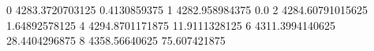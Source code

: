 0 4283.3720703125 0.4130859375
1 4282.958984375 0.0
2 4284.60791015625 1.64892578125
4 4294.8701171875 11.9111328125
6 4311.3994140625 28.4404296875
8 4358.56640625 75.607421875
